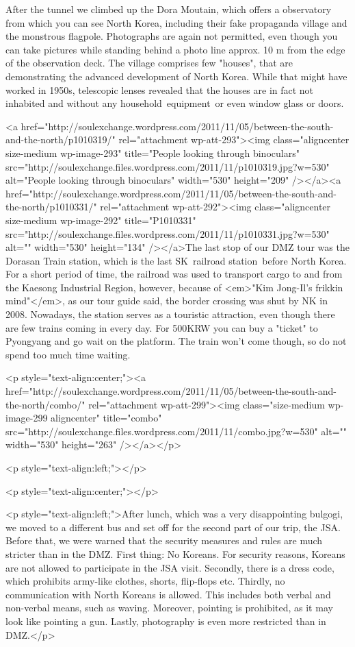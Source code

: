 \begin{post}
\begin{content}
After the tunnel we climbed up the Dora Moutain, which offers a observatory from which you can see North Korea, including their fake propaganda village and the monstrous flagpole. Photographs are again not permitted, even though you can take pictures while standing behind a photo line approx. 10 m from the edge of the observation deck. The village comprises few "houses", that are demonstrating the advanced development of North Korea. While that might have worked in 1950s, telescopic lenses revealed that the houses are in fact not inhabited and without any household equipment or even window glass or doors.



<a href="http://soulexchange.wordpress.com/2011/11/05/between-the-south-and-the-north/p1010319/" rel="attachment wp-att-293"><img class="aligncenter size-medium wp-image-293" title="People looking through binoculars" src="http://soulexchange.files.wordpress.com/2011/11/p1010319.jpg?w=530" alt="People looking through binoculars" width="530" height="209" /></a><a href="http://soulexchange.wordpress.com/2011/11/05/between-the-south-and-the-north/p1010331/" rel="attachment wp-att-292"><img class="aligncenter size-medium wp-image-292" title="P1010331" src="http://soulexchange.files.wordpress.com/2011/11/p1010331.jpg?w=530" alt="" width="530" height="134" /></a>The last stop of our DMZ tour was the Dorasan Train station, which is the last SK railroad station before North Korea. For a short period of time, the railroad was used to transport cargo to and from the Kaesong Industrial Region, however, because of <em>"Kim Jong-Il's frikkin mind"</em>, as our tour guide said, the border crossing was shut by NK in 2008. Nowadays, the station serves as a touristic attraction, even though there are few trains coming in every day. For 500KRW you can buy a "ticket" to Pyongyang and go wait on the platform. The train won't come though, so do not spend too much time waiting.

<p style="text-align:center;"><a href="http://soulexchange.wordpress.com/2011/11/05/between-the-south-and-the-north/combo/" rel="attachment wp-att-299"><img class="size-medium wp-image-299 aligncenter" title="combo" src="http://soulexchange.files.wordpress.com/2011/11/combo.jpg?w=530" alt="" width="530" height="263" /></a></p>

<p style="text-align:left;"></p>

<p style="text-align:center;"></p>

<p style="text-align:left;">After lunch, which was a very disappointing bulgogi, we moved to a different bus and set off for the second part of our trip, the JSA. Before that, we were warned that the security measures and rules are much stricter than in the DMZ. First thing: No Koreans. For security reasons, Koreans are not allowed to participate in the JSA visit. Secondly, there is a dress code, which prohibits army-like clothes, shorts, flip-flops etc. Thirdly, no communication with North Koreans is allowed. This includes both verbal and non-verbal means, such as waving. Moreover, pointing is prohibited, as it may look like pointing a gun. Lastly, photography is even more restricted than in DMZ.</p>


\end{content}
\end{post}
